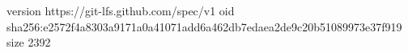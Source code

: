 version https://git-lfs.github.com/spec/v1
oid sha256:e2572f4a8303a9171a0a41071add6a462db7edaea2de9c20b51089973e37f919
size 2392
